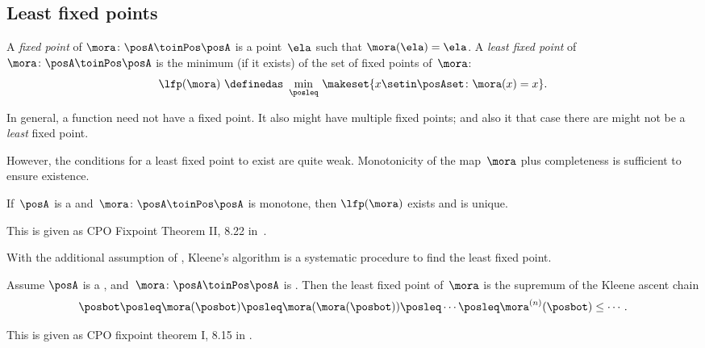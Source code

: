 \subsection{Least fixed points}

\begin{definition}
    \label{def:least-fixed}
    A \emph{fixed point} of $\mora\colon\posA\toinPos\posA$ is a point~$\ela$ such that $\mora(\ela)=\ela$.
    A \emph{least fixed point} of~$\mora\colon\posA\toinPos\posA$ is the minimum (if it exists) of the set of fixed points of~$\mora$:
    \begin{equation}
        \label{eq:lfp-one}
        \lfp(\mora)\,\,\definedas\,\,\min_{\posleq}\,\makeset{x\setin\posAset \colon \mora(x)=x}.
    \end{equation}
\end{definition}

In general, a function need not have a fixed point.
It also might have multiple fixed points; and also it that case there are might not be a \emph{least} fixed point.

However, the conditions for a least fixed point to exist are quite weak.
%
Monotonicity of the map~$\mora$ plus completeness is sufficient to ensure existence.

\begin{lemma}
    \label{lem:CPO-fix-point-2}
    If~$\posA$ is a \CPO and~$\mora\colon\posA\toinPos\posA$
    is monotone, then $\lfp(\mora)$ exists and is unique.
\end{lemma}
This is given as CPO Fixpoint Theorem II, 8.22 in~\cite{davey02}.

With the additional assumption of \scottcontinuity, Kleene's algorithm is a systematic procedure to find the least fixed point.

\begin{lemma}
    \label{lem:kleene-1}
    Assume $\posA$ is a \CPO, and~$\mora\colon\posA\toinPos\posA$ is \scottcontinuous.
    Then the least fixed point of~$\mora$ is the supremum of the Kleene ascent chain
    \begin{equation}
        \label{eq:kleene-iteration}
        \posbot\posleq \mora(\posbot)\posleq \mora(\mora(\posbot))\posleq\cdots\posleq \mora^{(n)}(\posbot)\leq\cdots.
    \end{equation}
\end{lemma}
This is given as CPO fixpoint theorem I, 8.15 in \cite{davey02}.

